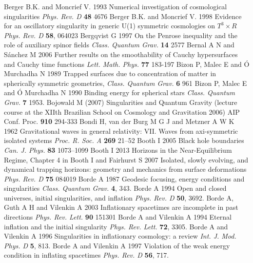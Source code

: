 \documentclass[12pt]{iopart}
\begin{document}
\begin{thebibliography}{999}
 Berger B.K. and Moncrief V. 1993 Numerical investigation of cosmological singularities {\it Phys. Rev. D} {\bf 48} 4676
 Berger B.K. and Moncrief V. 1998 Evidence for an oscillatory singularity in generic U(1) symmetric cosmologies on ${T^3} \times R$ {\it Phys. Rev. D} {\bf 58}, 064023
 Bergqvist G 1997 On the Penrose inequality and the role of auxiliary spinor fields {\it Class. Quantum Grav.} {\bf 14} 2577
 Bernal A N and S\'anchez M 2006 Further results on the smoothability of Cauchy hypersurfaces
and Cauchy time functions {\it Lett. Math. Phys.} {\bf 77} 183-197
 Bizon P, Malec E and \'{O} Murchadha N 1989 Trapped surfaces due
to concentration of matter in spherically symmetric geometries, {\it Class. Quantum Grav.} {\bf 6} 961 
 Bizon P, Malec E and \'{O} Murchadha N 1990 Binding energy for spherical stars {\it Class. Quantum Grav.} {\bf 7} 1953.
 Bojowald M (2007) Singularities and Quantum Gravity (lecture course at the XIIth Brazilian School on Cosmology and Gravitation 2006) AIP Conf. Proc. {\bf 910} 294-333
 Bondi H, van der Burg M G J and Metzner A W K 1962 Gravitational waves in general relativity: VII. Waves from axi-symmetric isolated systems {\it Proc. R. Soc. A} {\bf 269} 21--52
 Booth I 2005 Black hole boundaries {\it Can. J. Phys.} {\bf 83} 1073--1099
 Booth I 2013 Horizons in the Near-Equilibrium Regime, Chapter 4 in \cite{HayBook}
 Booth I and Fairhurst S 2007
Isolated, slowly evolving, and dynamical trapping horizons: geometry and mechanics from surface deformations {\it Phys. Rev. D} {\bf  75} 084019
 Borde A 1987 Geodesic focusing, energy conditions and singularities {\it Class. Quantum Grav.} {\bf 4}, 343.%
 Borde A 1994 Open and closed universes, initial singularities, and inflation {\it Phys. Rev. D} {\bf 50}, 3692.
 Borde A, Guth A H and Vilenkin A 2003 Inflationary spacetimes are incomplete in past directions {\it Phys. Rev. Lett.} {\bf 90} 151301
 Borde A and Vilenkin A 1994 Eternal inflation and the initial singularity {\it Phys. Rev. Lett.} {\bf 72},
3305.%
 Borde A and Vilenkin A 1996 Singularities in inflationary cosmology: a review {\it Int. J. Mod. Phys. D} {\bf 5}, 813.%
 Borde A and Vilenkin A 1997 Violation of the weak energy condition in inflating spacetimes {\it Phys. Rev. D} {\bf 56}, 717.%

\end{thebibliography}
\end{document}
